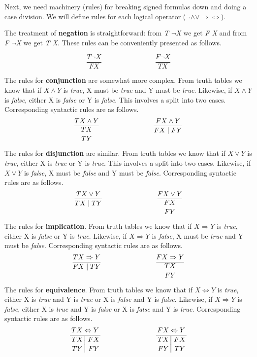 \documentclass{article}
\begin{document}
	\par
	Next, we need machinery (rules) for breaking signed formulas down and doing a case division. We will define rules for each logical operator ($\neg \land \lor \Rightarrow \Leftrightarrow$).

	\par
	The treatment of \textbf{negation} is straightforward: from \textit{T $\neg$X} we get \textit{F X} and from \textit{F $\neg$X} we get \textit{T X}. These rules can be conveniently presented as follows.

	\[
		\frac{T \neg X}{F X}\;\;\;\;\;\;\;\;\;\;\;\;\;\;\;\;\;\;\;\;\;\;\;\;\;\;\;\ \frac{F \neg X}{T X}
	\]

	\par

	The rules for \textbf{conjunction} are somewhat more complex. From truth tables we know that if $X \land Y$ is \textit{true}, X must be \textit{true} and Y must be \textit{true}. Likewise, if $X \land Y$ is \textit{false}, either X is \textit{false} or Y is \textit{false}. This involves a split into two cases. Corresponding syntactic rules are as follows.
	\[
		\frac{T X \land Y}{\displaystyle{T X \atop T Y}}\;\;\;\;\;\;\;\;\;\;\;\;\;\;\;\;\;\;\;\;\;\;\;\;\;\;\;\ \frac{F X \land Y}{F X \mid F Y}
	\]

	The rules for \textbf{disjunction} are similar. From truth tables we know that if $X \lor Y$ is \textit{true}, either X is \textit{true} or Y is \textit{true}. This involves a split into two cases. Likewise, if $X \lor Y$ is \textit{false}, X must be \textit{false} and Y must be \textit{false}. Corresponding syntactic rules are as follows.
	\[
		\frac{T X \lor Y}{T X \mid T Y}\;\;\;\;\;\;\;\;\;\;\;\;\;\;\;\;\;\;\;\;\;\;\;\;\;\;\;\ \frac{F X \lor Y}{\displaystyle{F X \atop F Y}}
	\]

	\par
	The rules for \textbf{implication}. From truth tables we know that if $X \Rightarrow Y$ is \textit{true}, either X is \textit{false} or Y is \textit{true}. Likewise, if $X \Rightarrow Y$ is \textit{false}, X must be \textit{true} and Y must be \textit{false}. Corresponding syntactic rules are as follows.
	\[
		\frac{T X \Rightarrow Y}{F X \mid T Y}\;\;\;\;\;\;\;\;\;\;\;\;\;\;\;\;\;\;\;\;\;\;\;\;\;\;\;\ \frac{F X \Rightarrow Y}{\displaystyle{T X \atop F Y}}
	\]

	\par
	The rules for \textbf{equivalence}. From truth tables we know that if $X \Leftrightarrow Y$ is \textit{true}, either X is \textit{true} and Y is \textit{true} or X is \textit{false} and Y is \textit{false}. Likewise, if $X \Rightarrow Y$ is \textit{false}, either X is \textit{true} and Y is \textit{false} or X is \textit{false} and Y is \textit{true}. Corresponding syntactic rules are as follows.
	\[
		\frac{T X \Leftrightarrow Y}{\left.\displaystyle{T X \atop T Y}\right\vert\displaystyle{F X \atop F Y}}\;\;\;\;\;\;\;\;\;\;\;\;\;\;\;\;\;\;\;\;\;\;\;\;\;\;\;\ \frac{F X \Leftrightarrow Y}{\left.\displaystyle{T X \atop F Y}\right\vert\displaystyle{F X \atop T Y}}
	\]
\end{document}

